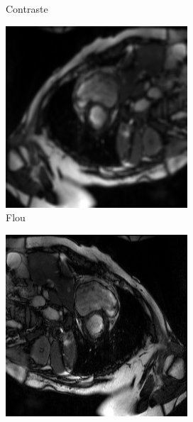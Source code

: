 \documentclass{article}
\begin{document}
\begin{figure}[!h]
\begin{subfigure}[b]{0.19\textwidth}
         \caption{Contraste}
         \label{fig:contrast}
     \end{subfigure}
	\hfill
     \begin{subfigure}[b]{0.19\textwidth}
         \centering
         \includegraphics[width=\textwidth]{figs/modifications/blur5.png}
         \caption{Flou}
         \label{fig:blur}
     \end{subfigure}
    \hfill
     \begin{subfigure}[b]{0.19\textwidth}
         \centering
         \includegraphics[width=\textwidth]{figs/modifications/hori.png}

\end{subfigure}
\end{figure}
\end{document}

